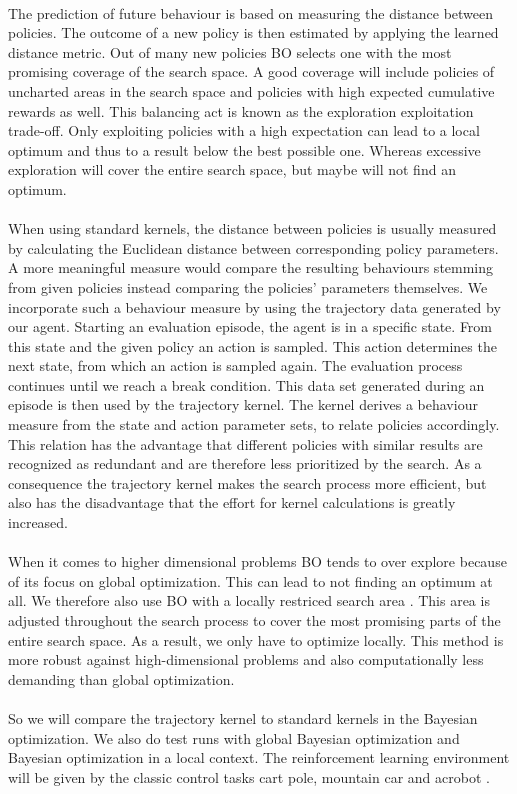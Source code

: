 \\
The prediction of future behaviour is based on measuring the distance between policies. The outcome of a new policy is then estimated by applying the learned distance metric. Out of many new policies BO selects one with the most promising coverage of the search space. A good coverage will include policies of uncharted areas in the search space and policies with high expected cumulative rewards as well. This balancing act is known as the exploration exploitation trade-off. Only exploiting policies with a high expectation can lead to a local optimum and thus to a result below the best possible one. Whereas excessive exploration will cover the entire search space, but maybe will not find an optimum.\\
\\
When using standard kernels, the distance between policies is usually measured by calculating the Euclidean distance between corresponding policy parameters. A more meaningful measure would compare the resulting behaviours stemming from given policies instead comparing the policies' parameters themselves. We incorporate such a behaviour measure by using the trajectory data generated by our agent. Starting an evaluation episode, the agent is in a specific state. From this state and the given policy an action is sampled. This action determines the next state, from which an action is sampled again. The evaluation process continues until we reach a break condition. This data set generated during an episode is then used by the trajectory kernel. The kernel derives a behaviour measure from the state and action parameter sets, to relate policies accordingly. This relation has the advantage that different policies with similar results are recognized as redundant and are therefore less prioritized by the search. As a consequence the trajectory kernel makes the search process more efficient, but also has the disadvantage that the effort for kernel calculations is greatly increased.\\
\\
When it comes to higher dimensional problems BO tends to over explore because of its focus on global optimization. This can lead to not finding an optimum at all. We therefore also use BO with a locally restriced search area \cite{akrour2017local}. This area is adjusted throughout the search process to cover the most promising parts of the entire search space. As a result, we only have to optimize locally. This method is more robust against high-dimensional problems and also computationally less demanding than global optimization.\\
\\
So we will compare the trajectory kernel to standard kernels in the Bayesian optimization. We also do test runs with global Bayesian optimization and Bayesian optimization in a local context. The reinforcement learning environment will be given by the classic control tasks cart pole, mountain car and acrobot \cite{sutton1998reinforcement}.\\
\\
